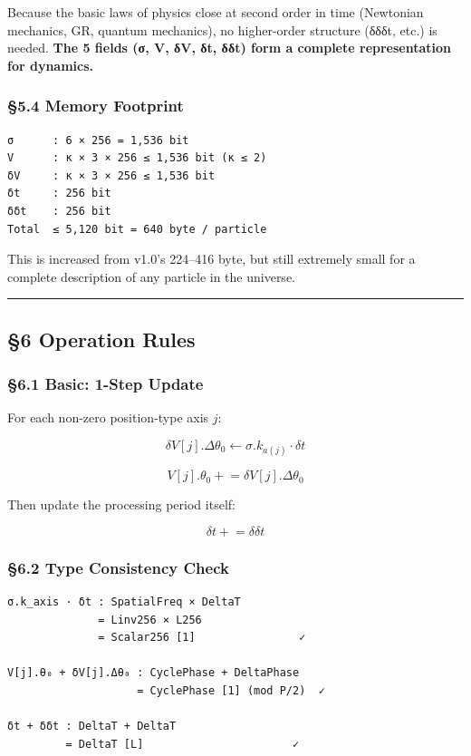 \documentclass[a4paper,11pt]{article}
\begin{document}
Because the basic laws of physics close at second order in time
(Newtonian mechanics, GR, quantum mechanics), no higher-order structure
(δδδt, etc.) is needed. \textbf{The 5 fields (σ, V, δV, δt, δδt) form a
complete representation for dynamics.}

\subsubsection{§5.4 Memory Footprint}\label{memory-footprint}

\begin{verbatim}
σ      : 6 × 256 = 1,536 bit
V      : κ × 3 × 256 ≤ 1,536 bit (κ ≤ 2)
δV     : κ × 3 × 256 ≤ 1,536 bit
δt     : 256 bit
δδt    : 256 bit
Total  ≤ 5,120 bit = 640 byte / particle
\end{verbatim}

This is increased from v1.0's 224--416 byte, but still extremely small
for a complete description of any particle in the universe.

\begin{center}\rule{0.5\linewidth}{0.5pt}\end{center}

\subsection{§6 Operation Rules}\label{operation-rules}

\subsubsection{§6.1 Basic: 1-Step Update}\label{basic-1-step-update}

For each non-zero position-type axis \(j\):

\[\delta V[j].\Delta\theta_0 \leftarrow \sigma.k_{a(j)} \cdot \delta t\]

\[V[j].\theta_0 \mathrel{+}= \delta V[j].\Delta\theta_0\]

Then update the processing period itself:

\[\delta t \mathrel{+}= \delta\delta t\]

\subsubsection{§6.2 Type Consistency
Check}\label{type-consistency-check}

\begin{verbatim}
σ.k_axis · δt : SpatialFreq × DeltaT 
              = Linv256 × L256 
              = Scalar256 [1]                ✓

V[j].θ₀ + δV[j].Δθ₀ : CyclePhase + DeltaPhase 
                    = CyclePhase [1] (mod P/2)  ✓

δt + δδt : DeltaT + DeltaT 
         = DeltaT [L]                       ✓
\end{verbatim}
\end{document}
